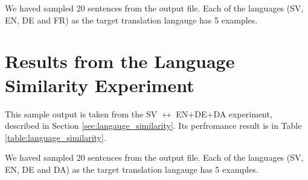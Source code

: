 \documentclass[thesis,fonts=libertine]{cluu}
\begin{document}
We haved sampled 20 sentences from the output file. Each of the languages (SV, EN, DE and FR) as the target translation langauge has 5 examples.



\section{Results from the Language Similarity Experiment}
This sample output is taken from the SV $\leftrightarrow$ EN+DE+DA experiment, described in Section \ref{sec:langauge_similarity}. Its perfromance result is in Table \ref{table:language_similarity}.

We haved sampled 20 sentences from the output file. Each of the languages (SV, EN, DE and DA) as the target translation langauge has 5 examples.



\printbibliography
\end{document}
